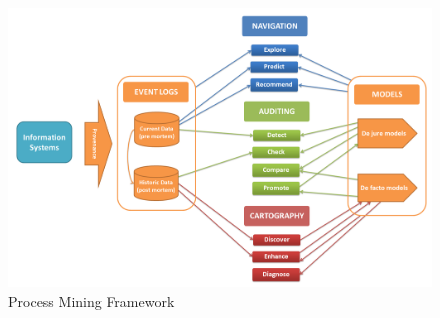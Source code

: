 \begin{figure}
  \centering
  \includegraphics[width=\textwidth]{2_relatedwork/process-mining-spectrum-v2}
  \caption{Process Mining Framework}
  \label{fig:process-mining-spectrum-v2}
\end{figure}

